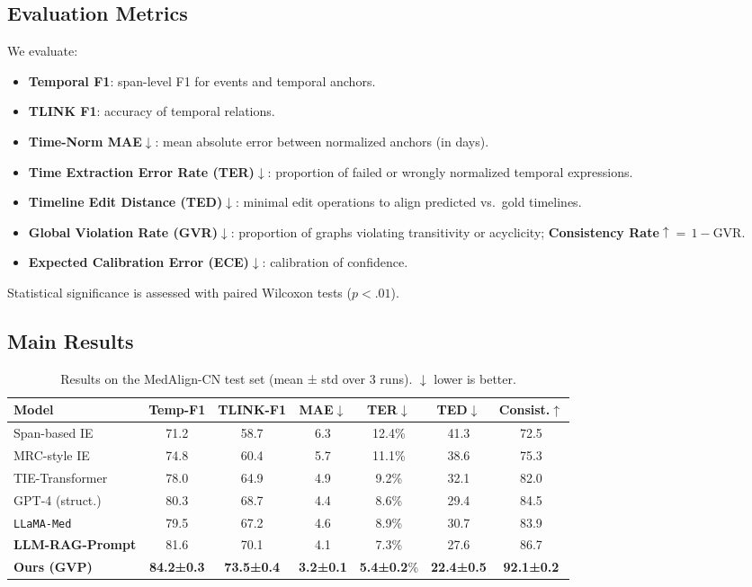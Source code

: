 \documentclass[11pt]{article}
\begin{document}
\begin{CJK*}{UTF8}{gbsn}
\subsection{Evaluation Metrics}
We evaluate:
\begin{itemize}[noitemsep,topsep=2pt,leftmargin=1.2em]
  \item \textbf{Temporal F1}: span-level F1 for events and temporal anchors.
  \item \textbf{TLINK F1}: accuracy of temporal relations.
  \item \textbf{Time-Norm MAE}$\downarrow$: mean absolute error between normalized anchors (in days).
  \item \textbf{Time Extraction Error Rate (TER)$\downarrow$}: proportion of failed or wrongly normalized temporal expressions.
  \item \textbf{Timeline Edit Distance (TED)$\downarrow$}: minimal edit operations to align predicted vs.\ gold timelines.
  \item \textbf{Global Violation Rate (GVR)$\downarrow$}: proportion of graphs violating transitivity or acyclicity; \textbf{Consistency Rate}$\uparrow {=}\,1{-}\text{GVR}$.
  \item \textbf{Expected Calibration Error (ECE)$\downarrow$}: calibration of confidence.
\end{itemize}
Statistical significance is assessed with paired Wilcoxon tests ($p{<}.01$).

\subsection{Main Results}
\begin{table}[t]
\centering
\setlength{\tabcolsep}{6pt}
\caption{Results on the MedAlign-CN test set (mean ± std over 3 runs). $\downarrow$ lower is better.}
\label{tab:main}
\small
\begin{tabular}{lcccccc}
\toprule
\textbf{Model} & \textbf{Temp-F1} & \textbf{TLINK-F1} & \textbf{MAE$\downarrow$} & \textbf{TER$\downarrow$} & \textbf{TED$\downarrow$} & \textbf{Consist.$\uparrow$} \\
\midrule
Span-based IE      & 71.2 & 58.7 & 6.3 & 12.4\% & 41.3 & 72.5 \\
MRC-style IE       & 74.8 & 60.4 & 5.7 & 11.1\% & 38.6 & 75.3 \\
TIE-Transformer     & 78.0 & 64.9 & 4.9 &  9.2\% & 32.1 & 82.0 \\
GPT-4 (struct.)    & 80.3 & 68.7 & 4.4 &  8.6\% & 29.4 & 84.5 \\
\texttt{LLaMA-Med} & 79.5 & 67.2 & 4.6 &  8.9\% & 30.7 & 83.9 \\
\textbf{LLM-RAG-Prompt} & 81.6 & 70.1 & 4.1 &  7.3\% & 27.6 & 86.7 \\
\midrule
\textbf{Ours (GVP)} & \textbf{84.2±0.3} & \textbf{73.5±0.4} & \textbf{3.2±0.1} & \textbf{5.4±0.2}\% & \textbf{22.4±0.5} & \textbf{92.1±0.2} \\
\bottomrule
\end{tabular}
\end{table}


\end{CJK*}
\end{document}
